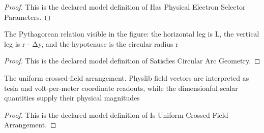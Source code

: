 \begin{proof}
  This is the declared model definition of Has Physical Electron Selector Parameters.
\end{proof}
\begin{definition}
  \label{def:physics:phyx-mini-0634:phyxminiproblems-problemphyxmini0634-satisfiescirculararcgeometry}
  The Pythagorean relation visible in the figure: the horizontal leg is L, the vertical leg is r - Δy, and the hypotenuse is the circular radius r
\end{definition}
\begin{proof}
  This is the declared model definition of Satisfies Circular Arc Geometry.
\end{proof}
\begin{definition}
  \label{def:physics:phyx-mini-0634:phyxminiproblems-problemphyxmini0634-isuniformcrossedfieldarrangement}
  The uniform crossed-field arrangement. Physlib field vectors are interpreted as tesla and volt-per-meter coordinate readouts, while the dimensionful scalar quantities supply their physical magnitudes
\end{definition}
\begin{proof}
  This is the declared model definition of Is Uniform Crossed Field Arrangement.
\end{proof}
